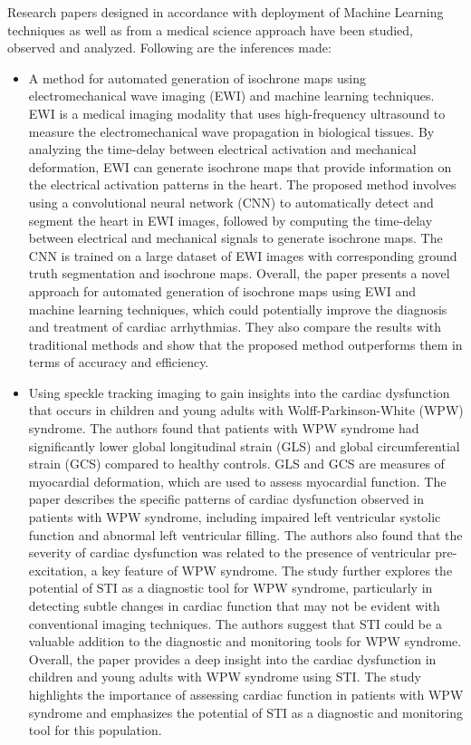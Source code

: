 Research papers designed in accordance with deployment of Machine Learning techniques as well as from a medical science approach have been studied, observed and analyzed. Following are the inferences made:  

\begin{itemize}
	\item A method for automated generation of isochrone maps using electromechanical wave imaging (EWI) and machine learning techniques. EWI is a medical imaging modality that uses high-frequency ultrasound to measure the electromechanical wave propagation in biological tissues. By analyzing the time-delay between electrical activation and mechanical deformation, EWI can generate isochrone maps that provide information on the electrical activation patterns in the heart. The proposed method involves using a convolutional neural network (CNN) to automatically detect and segment the heart in EWI images, followed by computing the time-delay between electrical and mechanical signals to generate isochrone maps. The CNN is trained on a large dataset of EWI images with corresponding ground truth segmentation and isochrone maps. Overall, the paper presents a novel approach for automated generation of isochrone maps using EWI and machine learning techniques, which could potentially improve the diagnosis and treatment of cardiac arrhythmias. They also compare the results with traditional methods and show that the proposed method outperforms them in terms of accuracy and efficiency. 
	
	\item Using speckle tracking imaging to gain insights into the cardiac dysfunction that occurs in children and young adults with Wolff-Parkinson-White (WPW) syndrome. The authors found that patients with WPW syndrome had significantly lower global longitudinal strain (GLS) and global circumferential strain (GCS) compared to healthy controls. GLS and GCS are measures of myocardial deformation, which are used to assess myocardial function. The paper describes the specific patterns of cardiac dysfunction observed in patients with WPW syndrome, including impaired left ventricular systolic function and abnormal left ventricular filling. The authors also found that the severity of cardiac dysfunction was related to the presence of ventricular pre-excitation, a key feature of WPW syndrome. The study further explores the potential of STI as a diagnostic tool for WPW syndrome, particularly in detecting subtle changes in cardiac function that may not be evident with conventional imaging techniques. The authors suggest that STI could be a valuable addition to the diagnostic and monitoring tools for WPW syndrome. Overall, the paper provides a deep insight into the cardiac dysfunction in children and young adults with WPW syndrome using STI. The study highlights the importance of assessing cardiac function in patients with WPW syndrome and emphasizes the potential of STI as a diagnostic and monitoring tool for this population. 
	

\end{itemize}
